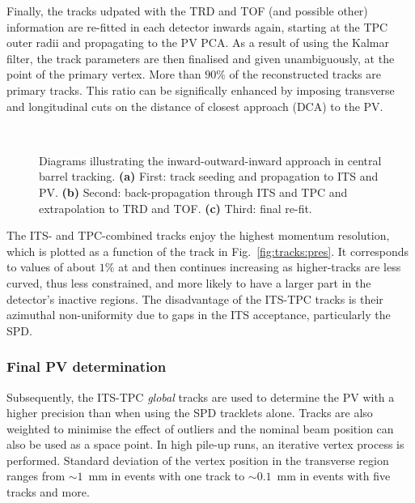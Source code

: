 Finally, the tracks udpated with the TRD and TOF (and possible other) information are re-fitted in each detector inwards again, starting at the TPC outer radii and propagating to the PV PCA. As a result of using the Kalmar filter, the track parameters are then finalised and given unambiguously, at the point of the primary vertex. More than $90\%$ of the reconstructed tracks are primary tracks. This ratio can be significally enhanced by imposing transverse and longitudinal cuts on the distance of closest approach (DCA) to the PV.

\begin{figure}[!h]
\hspace{1em}
\\
\caption{Diagrams illustrating the inward-outward-inward approach in central barrel tracking. \textbf{(a)} First: track seeding and propagation to ITS and PV. \textbf{(b)} Second: back-propagation through ITS and TPC and extrapolation to TRD and TOF. \textbf{(c)} Third: final re-fit. \cite{maireProductionBaryonsMultietranges2011}}
\label{fig:tracks:tracking}
\end{figure}

The ITS- and TPC-combined tracks enjoy the highest momentum resolution, which is plotted as a function of the track \pt in Fig.~\ref{fig:tracks:pres}. It corresponds to values of about $1\%$ at  and then continues increasing as higher-\pt tracks are less curved, thus less constrained, and more likely to have a larger part in the detector's inactive regions. The disadvantage of the ITS-TPC tracks is their azimuthal non-uniformity due to gaps in the ITS acceptance, particularly the SPD.

\subsubsection*{Final PV determination}

Subsequently, the ITS-TPC \textit{global} tracks are used to determine the PV with a higher precision than when using the SPD tracklets alone. Tracks are also weighted to minimise the effect of outliers and the nominal beam position can also be used as a space point. In high pile-up runs, an iterative vertex process is performed. Standard deviation of the vertex position in the transverse region ranges from $\sim 1$~mm in events with one track to $\sim 0.1$~mm in events with five tracks and more.

